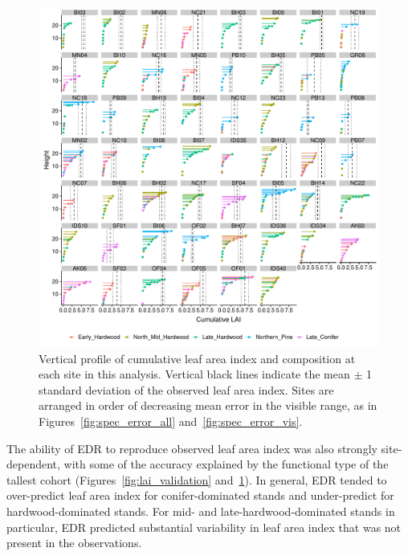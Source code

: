 \begin{figure}
  \centering
  \includegraphics[width=\textwidth]{4_edr/figures/explore_spectra/ed_cumlai_plot.pdf}
  \caption{%
    Vertical profile of cumulative leaf area index and composition at each site in this analysis.
    Vertical black lines indicate the mean $\pm$ 1 standard deviation of the observed leaf area index.
    Sites are arranged in order of decreasing mean error in the visible range, as in Figures~\ref{fig:spec_error_all} and~\ref{fig:spec_error_vis}.
  }\label{fig:lai_profile}
\end{figure}

The ability of EDR to reproduce observed leaf area index was also strongly site-dependent, with some of the accuracy explained by the functional type of the tallest cohort (Figures~\ref{fig:lai_validation} and~\ref{fig:lai_profile}).
In general, EDR tended to over-predict leaf area index for conifer-dominated stands and under-predict for hardwood-dominated stands.
For mid- and late-hardwood-dominated stands in particular, EDR predicted substantial variability in leaf area index that was not present in the observations.



